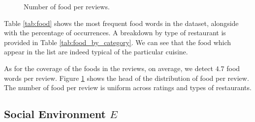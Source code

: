 \begin{figure}
\begin{center}
\caption{Number of food per reviews.}
\label{fig:food_per_review}
\end{center}
\end{figure}



Table \ref{tab:food} shows the most frequent food words in the dataset, alongside with the percentage of occurrences. A breakdown by type of restaurant is provided in Table \ref{tab:food_by_category}. We can see that the food which appear in the list are indeed typical of the particular cuisine.

As for the coverage of the foods in the reviews, on average, we detect $4.7$ food words per review. Figure \ref{fig:food_per_review} shows the head of the distribution of food per review. The number of food per review is uniform across ratings and types of restaurants.


\subsection{Social Environment $E$}



